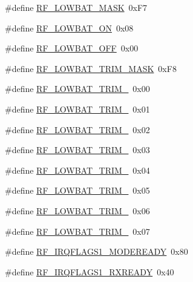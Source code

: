 \begin{DoxyCompactItemize}
\item 
\#define \mbox{\hyperlink{sx1276_regs-_fsk_8h_abaff91d450af8669ffd50eb619e28483}{R\+F\+\_\+\+L\+O\+W\+B\+A\+T\+\_\+\+M\+A\+SK}}~0x\+F7
\item 
\#define \mbox{\hyperlink{sx1276_regs-_fsk_8h_ac8bf5b979c71e1fa7ff998f96136001c}{R\+F\+\_\+\+L\+O\+W\+B\+A\+T\+\_\+\+ON}}~0x08
\item 
\#define \mbox{\hyperlink{sx1276_regs-_fsk_8h_a5f220eb10ea52a4dfc62ca4675ddb55f}{R\+F\+\_\+\+L\+O\+W\+B\+A\+T\+\_\+\+O\+FF}}~0x00
\item 
\#define \mbox{\hyperlink{sx1276_regs-_fsk_8h_a668694c9fd9267c3dc4fa53354319ed9}{R\+F\+\_\+\+L\+O\+W\+B\+A\+T\+\_\+\+T\+R\+I\+M\+\_\+\+M\+A\+SK}}~0x\+F8
\item 
\#define \mbox{\hyperlink{sx1276_regs-_fsk_8h_a85288dbdf38735bd011bcdb471e993c7}{R\+F\+\_\+\+L\+O\+W\+B\+A\+T\+\_\+\+T\+R\+I\+M\+\_}}~0x00
\item 
\#define \mbox{\hyperlink{sx1276_regs-_fsk_8h_af835b4f1f8a866a42b09fa2e3f09c5cd}{R\+F\+\_\+\+L\+O\+W\+B\+A\+T\+\_\+\+T\+R\+I\+M\+\_}}~0x01
\item 
\#define \mbox{\hyperlink{sx1276_regs-_fsk_8h_ab0728e7072fa3d8924b464744703f078}{R\+F\+\_\+\+L\+O\+W\+B\+A\+T\+\_\+\+T\+R\+I\+M\+\_}}~0x02
\item 
\#define \mbox{\hyperlink{sx1276_regs-_fsk_8h_a7eecdc654023bc207f44edb51eadc593}{R\+F\+\_\+\+L\+O\+W\+B\+A\+T\+\_\+\+T\+R\+I\+M\+\_}}~0x03
\item 
\#define \mbox{\hyperlink{sx1276_regs-_fsk_8h_a460e532d54bd79a1403c4597e1fe00f9}{R\+F\+\_\+\+L\+O\+W\+B\+A\+T\+\_\+\+T\+R\+I\+M\+\_}}~0x04
\item 
\#define \mbox{\hyperlink{sx1276_regs-_fsk_8h_a1b4874343fe46f3e926ed05c244a418c}{R\+F\+\_\+\+L\+O\+W\+B\+A\+T\+\_\+\+T\+R\+I\+M\+\_}}~0x05
\item 
\#define \mbox{\hyperlink{sx1276_regs-_fsk_8h_ae5f2e0d03a4c5fa134faafcebc5fa522}{R\+F\+\_\+\+L\+O\+W\+B\+A\+T\+\_\+\+T\+R\+I\+M\+\_}}~0x06
\item 
\#define \mbox{\hyperlink{sx1276_regs-_fsk_8h_aabf95f34e7473a492e723c6adfffd368}{R\+F\+\_\+\+L\+O\+W\+B\+A\+T\+\_\+\+T\+R\+I\+M\+\_}}~0x07
\item 
\#define \mbox{\hyperlink{sx1276_regs-_fsk_8h_a9af03b2b868666a55780e8337c6e7497}{R\+F\+\_\+\+I\+R\+Q\+F\+L\+A\+G\+S1\+\_\+\+M\+O\+D\+E\+R\+E\+A\+DY}}~0x80
\item 
\#define \mbox{\hyperlink{sx1276_regs-_fsk_8h_ad4616b07e6107a520a6736e7d3759d3c}{R\+F\+\_\+\+I\+R\+Q\+F\+L\+A\+G\+S1\+\_\+\+R\+X\+R\+E\+A\+DY}}~0x40

\end{DoxyCompactItemize}

